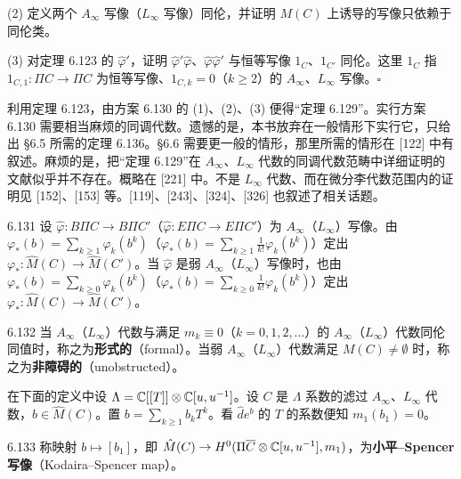 (2) 定义两个 $A_{\infty}$ 写像（$L_{\infty}$ 写像）同伦，并证明 $M(C)$ 上诱导的写像只依赖于同伦类。

(3) 对定理 6.123 的 $\hat\varphi'$，证明 $\hat\varphi'\hat\varphi$、$\hat\varphi\hat\varphi'$ 与恒等写像 $1_C$、$1_{C'}$ 同伦。这里 $1_C$ 指 $1_{C,1}\colon\Pi C\to\Pi C$ 为恒等写像、$1_{C,k}=0$（$k\ge2$）的 $A_{\infty}$、$L_{\infty}$ 写像。\hfill$\square$

利用定理 6.123，由方案 6.130 的 (1)、(2)、(3) 便得“定理 6.129”。实行方案 6.130 需要相当麻烦的同调代数。遗憾的是，本书放弃在一般情形下实行它，只给出 §6.5 所需的定理 6.136。§6.6 需要更一般的情形，那里所需的情形在 [122] 中有叙述。麻烦的是，把“定理 6.129”在 $A_{\infty}$、$L_{\infty}$ 代数的同调代数范畴中详细证明的文献似乎并不存在。概略在 [221] 中。不是 $L_{\infty}$ 代数、而在微分李代数范围内的证明见 [152]、[153] 等。[119]、[243]、[324]、[326] 也叙述了相关话题。

\begin{definition}{6.131}
  设 $\hat\varphi\colon B\Pi C\to B\Pi C'$（$\hat\varphi\colon E\Pi C\to E\Pi C'$）为 $A_{\infty}$（$L_{\infty}$）写像。由 $\varphi_*(b)=\sum_{k\ge1}\varphi_k(b^k)$（$\varphi_*(b)=\sum_{k\ge1}\frac{1}{k!}\varphi_k(b^k)$）定出 $\varphi_*\colon\hat M(C)\to\hat M(C')$。当 $\hat\varphi$ 是弱 $A_{\infty}$（$L_{\infty}$）写像时，也由 $\varphi_*(b)=\sum_{k\ge0}\varphi_k(b^k)$（$\varphi_*(b)=\sum_{k\ge0}\frac{1}{k!}\varphi_k(b^k)$）定出 $\varphi_*\colon\hat M(C)\to\hat M(C')$。
\end{definition}

\begin{definition}{6.132}
  当 $A_{\infty}$（$L_{\infty}$）代数与满足 $m_k\equiv0$（$k=0,1,2,\dots$）的 $A_{\infty}$（$L_{\infty}$）代数同伦同值时，称之为\textbf{形式的}（formal）。当弱 $A_{\infty}$（$L_{\infty}$）代数满足 $M(C)\neq\emptyset$ 时，称之为\textbf{非障碍的}（unobstructed）。

\end{definition}

在下面的定义中设 $\Lambda=\mathbb{C}[[T]]\otimes\mathbb{C}[u,u^{-1}]$。设 $C$ 是 $\Lambda$ 系数的滤过 $A_{\infty}$、$L_{\infty}$ 代数，$b\in\hat M(C)$。置 $b=\sum_{k\ge1}b_kT^k$。看 $\hat de^b$ 的 $T$ 的系数便知 $m_1(b_1)=0$。

\begin{definition}{6.133}
  称映射 $b\mapsto[b_1]$，即 $\hat M(C)\to H^0(\Pi\overline C\otimes\mathbb{C}[u,u^{-1}],m_1)$，为\textbf{小平–Spencer 写像}（Kodaira–Spencer map）。
\end{definition}

